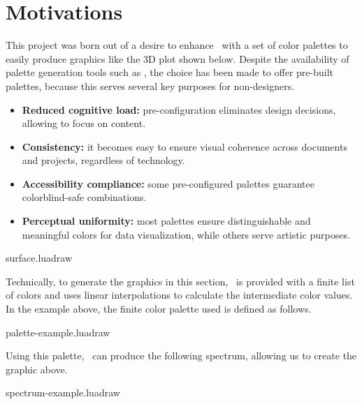 \documentclass{tutodoc}
\begin{document}
\section{Motivations}

This project was born out of a desire to enhance \LUADRAW\ with a set of color palettes to easily produce graphics like the 3D plot shown below.
%
Despite the availability of palette generation tools such as \coolors, the choice has been made to offer pre-built palettes, because this serves several key purposes for non-designers.
%
\begin{itemize}
    \item \textbf{Reduced cognitive load:} pre-configuration eliminates design decisions, allowing to focus on content.

    \item \textbf{Consistency:} it becomes easy to ensure visual coherence across documents and projects, regardless of technology.

    \item \textbf{Accessibility compliance:} some pre-configured palettes guarantee colorblind-safe combinations.

    \item \textbf{Perceptual uniformity:} most palettes ensure distinguishable and meaningful colors for data visualization, while others serve artistic purposes.
\end{itemize}


\begin{center}
    {surface.luadraw}
\end{center}




Technically, to generate the graphics in this section, \LUADRAW\ is provided with a finite list of colors and uses linear interpolations to calculate the intermediate color values. In the example above, the finite color palette used is defined as follows.
%
\begin{center}
    {palette-example.luadraw}
\end{center}

Using this palette, \LUADRAW\ can produce the following spectrum, allowing us to create the graphic above.
%
\begin{center}
    {spectrum-example.luadraw}
\end{center}


\end{document}
